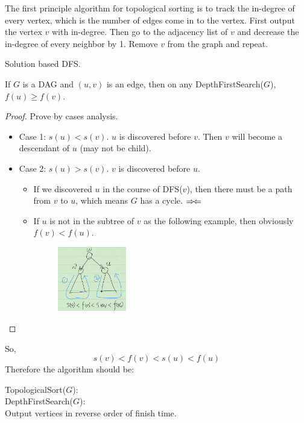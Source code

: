 \documentclass[en,hazy,blue,normal,12pt]{elegantnote}
\newcommand\tab[1][1cm]{\hspace*{#1}}
\begin{document}
The first principle algorithm for topological sorting is to track the in-degree 
of every vertex, which is the number of edges come in to the vertex. First 
output the vertex $v$ with in-degree. Then go to the adjacency list of $v$ and 
decrease the in-degree of every neighbor by 1. Remove $v$ from the graph and 
repeat.

Solution based DFS.
\begin{theorem}
 If $G$ is a DAG and $(u, v)$ is an edge, then on any DepthFirstSearch($G$), 
$f(u) \ge f(v)$.
\end{theorem}

\begin{proof}
Prove by cases analysis.
 \begin{itemize}
  \item Case 1: $s(u) < s(v)$. $u$ is discovered before $v$. Then $v$ will 
become a descendant of $u$ (may not be child).
  \item Case 2: $s(u) > s(v)$. $v$ is discovered before $u$. 
  \begin{itemize}
   \item If we discovered $u$ in the course of DFS($v$), then there must be 
a path from $v$ to $u$, which means $G$ has a cycle. 
$\Rightarrow\mskip-\thinmuskip\Leftarrow$
    \item If $u$ is not in the subtree of $v$ as the following example, 
then obviously $f(v) < f(u)$.
        \begin{figure}[H]
        \centering
        \includegraphics[width=0.3\textwidth]{dfs-s-f.png}
        \end{figure}
  \end{itemize}
 \end{itemize}
\end{proof}

So, \[s(v) < f(v) < s(u) < f(u)\]
Therefore the algorithm should be:

TopologicalSort($G$):\\
\tab\tab DepthFirstSearch($G$):\\
\tab\tab\tab\tab Output vertices in reverse order of finish time.
\end{document}
